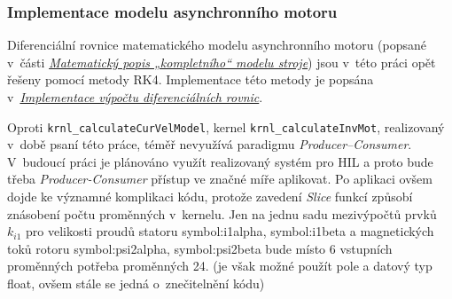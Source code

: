 \documentclass[a4paper, twoside, 11pt]{article}
\newcommand{\fbar}{\FloatBarrier}
\begin{document}
		\subsubsection{Implementace modelu asynchronního motoru}
			Diferenciální rovnice matematického modelu asynchronního motoru (popsané v~části \hyperref[subsec:matematicky-popis-kompletniho-modelu-stroje]{\textit{Matematický popis „kompletního“ modelu stroje}}) jsou v~této práci opět řešeny pomocí metody RK4. Implementace této metody je popsána v~\hyperref[subsubsec:implementace-vypoctu-diferencialnich-rovnic]{\textit{Implementace výpočtu diferenciálních rovnic}}.\par
			Oproti \texttt{krnl\_calculateCurVelModel}, kernel \texttt{krnl\_calculateInvMot}, realizovaný v~době psaní této práce, téměř nevyužívá paradigmu \textit{Producer–Consumer}. V~budoucí práci je plánováno využít realizovaný systém pro HIL a proto bude třeba \textit{Producer-Consumer} přístup ve značné míře aplikovat. Po aplikaci ovšem dojde ke významné komplikaci kódu, protože zavedení \textit{Slice} funkcí způsobí znásobení počtu proměnných v~kernelu. Jen na jednu sadu mezivýpočtů prvků $k_{i1}$ pro velikosti proudů statoru \gls{symbol:i1alpha}, \gls{symbol:i1beta} a magnetických toků rotoru \gls{symbol:psi2alpha}, \gls{symbol:psi2beta} bude místo 6 vstupních proměnných potřeba proměnných 24. (je však možné použít pole a datový typ float, ovšem stále se jedná o~znečitelnění kódu)\par


	\fbar
\end{document}
